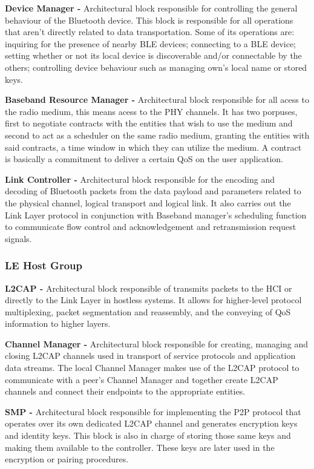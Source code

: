 \textbf{Device Manager -} Architectural block responsible for controlling the general behaviour of the Bluetooth device. This block is responsible for all operations that aren't directly related to data transportation. Some of its operations are: inquiring for the presence of nearby  \ac{BLE} devices; connecting to a \ac{BLE} device; setting whether or not its local device is discoverable and/or connectable by the others; controlling device behaviour such as managing own's local name or stored keys. 


\textbf{Baseband Resource Manager -} Architectural block responsible for all acess to the radio medium, this means acess to the \ac{PHY} channels. It has two porpuses, first to negotiate contracts with the entities that wish to use the medium and second to act as a scheduler on the same radio medium, granting the entities with said contracts, a time window in which they can utilize the medium. A contract is basically a commitment to deliver a certain \ac{QoS} on the user application.


\textbf{Link Controller -} Architectural block responsible for the encoding and decoding of Bluetooth packets from the data payload and parameters related to the physical channel, logical transport and logical link. It also carries out the Link Layer protocol in conjunction with Baseband manager's scheduling function to communicate flow control and acknowledgement and retransmission request signals.



\subsubsection{ \ac{LE} Host Group}
\label{subsec:LEHost}

\textbf{\ac{L2CAP} -} Architectural block responsible of transmits packets to the \ac{HCI} or directly to the Link Layer in hostless systems. It allows for higher-level protocol multiplexing, packet segmentation and reassembly, and the conveying of \ac{QoS} information to higher layers.

 
\textbf{Channel Manager -} Architectural block responsible for creating, managing and closing \ac{L2CAP} channels used in transport of service protocols and application data streams. The local Channel Manager makes use of the \ac{L2CAP} protocol to communicate with a peer's Channel Manager and together create \ac{L2CAP} channels and connect their endpoints to the appropriate entities.


\textbf{\ac{SMP} -} Architectural block responsible for implementing the \ac{P2P} protocol that operates over its own dedicated \ac{L2CAP} channel and generates encryption keys and identity keys. This block is also in charge of storing those same keys and making them available to the controller. These keys are later used in the encryption or pairing procedures.


